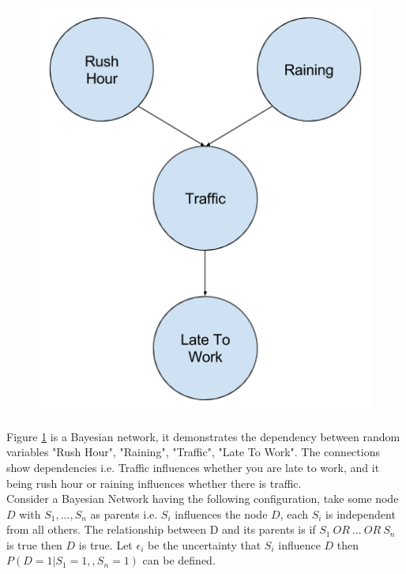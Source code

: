 \begin{figure}[H]
  \centering
  \begin{minipage}[b]{0.4\textwidth}
    \includegraphics[width=\textwidth]{bayesian-network-example.png}
    \caption{}
    \label{fig:bayesian-network-example}
  \end{minipage}
  \hfill
\end{figure}

Figure \ref{fig:bayesian-network-example} is a Bayesian network, it demonstrates the dependency between random variables "Rush Hour", "Raining", "Traffic", "Late To Work". The connections show dependencies i.e. Traffic influences whether you are late to work, and it being rush hour or raining influences whether there is traffic.\\

Consider a Bayesian Network having the following configuration, take some node $D$ with $S_1,..., S_n$ as parents i.e. $S_i$ influences the node $D$, each $S_i$ is independent from all others. The relationship between D and its parents is if $S_1\ OR\ ...\ OR\ S_n$ is true then $D$ is true. Let $\epsilon_i$ be the uncertainty that $S_i$ influence $D$ then $P(D = 1| S_1 = 1, , S_n = 1)$ can be defined.

